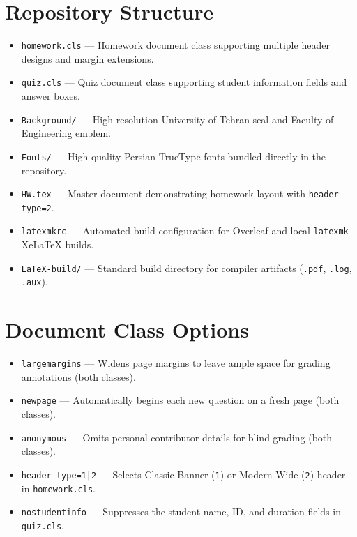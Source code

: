 \documentclass[10pt,a4paper]{article}
\begin{document}
\section{Repository Structure}
\begin{itemize}[leftmargin=1.5em, itemsep=0.2em]
    \item \texttt{homework.cls} --- Homework document class supporting multiple header designs and margin extensions.
    \item \texttt{quiz.cls} --- Quiz document class supporting student information fields and answer boxes.
    \item \texttt{Background/} --- High-resolution University of Tehran seal and Faculty of Engineering emblem.
    \item \texttt{Fonts/} --- High-quality Persian TrueType fonts bundled directly in the repository.
    \item \texttt{HW.tex} --- Master document demonstrating homework layout with \texttt{header-type=2}.
    \item \texttt{latexmkrc} --- Automated build configuration for Overleaf and local \texttt{latexmk} XeLaTeX builds.
    \item \texttt{LaTeX-build/} --- Standard build directory for compiler artifacts (\texttt{.pdf}, \texttt{.log}, \texttt{.aux}).
\end{itemize}

\section{Document Class Options}
\begin{itemize}[leftmargin=1.5em, itemsep=0.2em]
    \item \texttt{largemargins} --- Widens page margins to leave ample space for grading annotations (both classes).
    \item \texttt{newpage} --- Automatically begins each new question on a fresh page (both classes).
    \item \texttt{anonymous} --- Omits personal contributor details for blind grading (both classes).
    \item \texttt{header-type=1|2} --- Selects Classic Banner (\texttt{1}) or Modern Wide (\texttt{2}) header in \texttt{homework.cls}.
    \item \texttt{nostudentinfo} --- Suppresses the student name, ID, and duration fields in \texttt{quiz.cls}.
\end{itemize}

\clearpage
\end{document}
